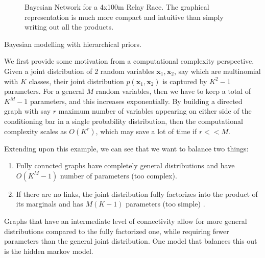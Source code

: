 \begin{example}
\begin{figure}[H]
      \caption{Bayesian Network for a 4x100m Relay Race. The graphical representation is much more compact and intuitive than simply writing out all the products. }
      \label{fig:relay_race}
    \end{figure}
  \end{example} 

  Bayesian modelling with hierarchical priors. 

  \begin{example}[Multinomial]
    We first provide some motivation from a computational complexity perspective. Given a joint distribution of 2 random variables $\mathbf{x}_1, \mathbf{x}_2$, say which are multinomial with $K$ classes, their joint distribution $p(\mathbf{x}_1, \mathbf{x}_2)$ is captured by $K^2 - 1$ parameters. For a general $M$ random variables, then we have to keep a total of $K^M - 1$ parameters, and this increases exponentially. By building a directed graph with say $r$ maximum number of variables appearing on either side of the conditioning bar in a single probability distribution, then the computational complexity scales as $O(K^r)$, which may save a lot of time if $r << M$. 
  \end{example}

  Extending upon this example, we can see that we want to balance two things: 
  \begin{enumerate} 
    \item Fully conncted graphs have completely general distributions and have $O(K^M -1)$ number of parameters (too complex). 
    \item If there are no links, the joint distribution fully factorizes into the product of its marginals and has $M(K-1)$ parameters (too simple) . 
  \end{enumerate}
  Graphs that have an intermediate level of connectivity allow for more general distributions compared to the fully factorized one, while requiring fewer parameters than the general joint distribution. One model that balances this out is the hidden markov model. 

